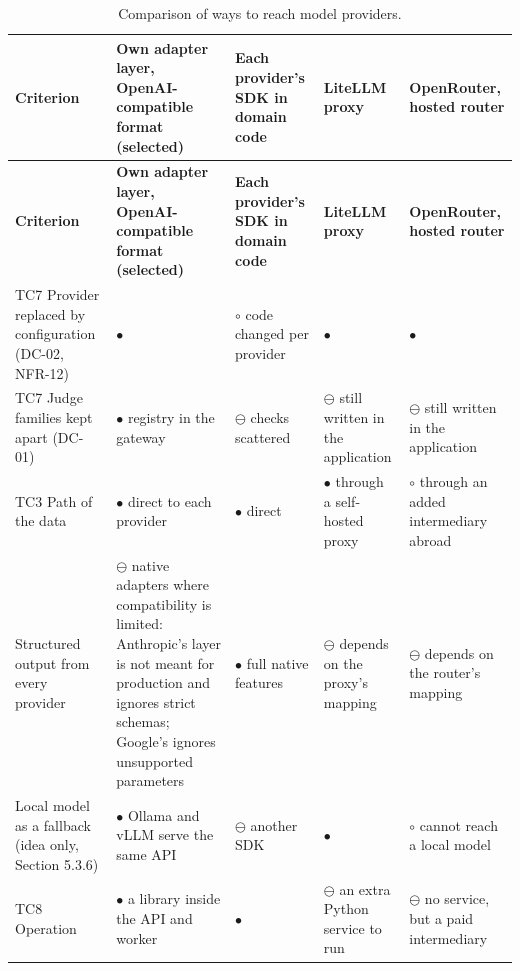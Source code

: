 {\small{}\renewcommand{\arraystretch}{1.1}
\begin{longtable}{|>{\raggedright\arraybackslash}p{}|>{\raggedright\arraybackslash}p{}|>{\raggedright\arraybackslash}p{}|>{\raggedright\arraybackslash}p{}|>{\raggedright\arraybackslash}p{}|}
\caption{Comparison of ways to reach model providers.} \\
\hline
\textbf{Criterion} & \textbf{Own adapter layer, OpenAI-\allowbreak{}compatible format (selected)} & \textbf{Each provider's SDK in domain code} & \textbf{LiteLLM proxy\cite{r191}} & \textbf{OpenRouter, hosted router\cite{r192}} \\ \hline
\endfirsthead
\hline
\textbf{Criterion} & \textbf{Own adapter layer, OpenAI-\allowbreak{}compatible format (selected)} & \textbf{Each provider's SDK in domain code} & \textbf{LiteLLM proxy\cite{r191}} & \textbf{OpenRouter, hosted router\cite{r192}} \\ \hline
\endhead
TC7 Provider replaced by configuration (DC-02, NFR-12) & $\bullet$ & $\circ$ code changed per provider & $\bullet$ & $\bullet$ \\ \hline
TC7 Judge families kept apart (DC-01) & $\bullet$ registry in the gateway & $\ominus$ checks scattered & $\ominus$ still written in the application & $\ominus$ still written in the application \\ \hline
TC3 Path of the data & $\bullet$ direct to each provider & $\bullet$ direct & $\bullet$ through a self-hosted proxy & $\circ$ through an added intermediary abroad \\ \hline
Structured output from every provider & $\ominus$ native adapters where compatibility is limited: Anthropic's layer is not meant for production and ignores strict schemas\cite{r195}; Google's ignores unsupported parameters\cite{r196} & $\bullet$ full native features & $\ominus$ depends on the proxy's mapping & $\ominus$ depends on the router's mapping \\ \hline
Local model as a fallback (idea only, Section 5.3.6) & $\bullet$ Ollama and vLLM serve the same API\cite{r193,r194} & $\ominus$ another SDK & $\bullet$ & $\circ$ cannot reach a local model \\ \hline
TC8 Operation & $\bullet$ a library inside the API and worker & $\bullet$ & $\ominus$ an extra Python service to run & $\ominus$ no service, but a paid intermediary \\ \hline
\end{longtable}
}

